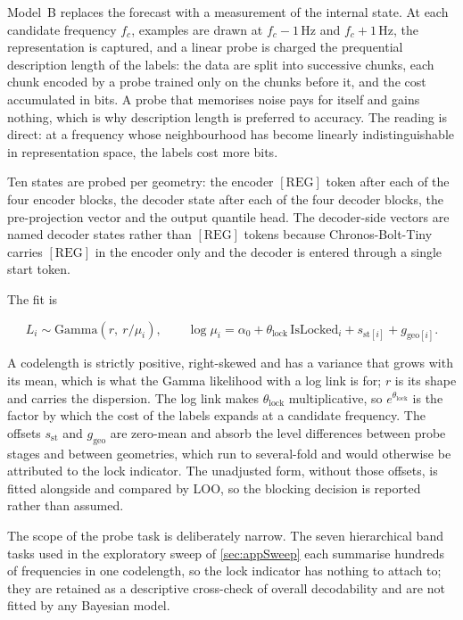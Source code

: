 Model~B replaces the forecast with a measurement of the internal state. At each candidate frequency $f_c$, examples are drawn at $f_c-1$\,Hz and $f_c+1$\,Hz, the representation is captured, and a linear probe is charged the prequential description length of the labels\autocite{voitaInformationTheoreticProbingMinimum2020}: the data are split into successive chunks, each chunk encoded by a probe trained only on the chunks before it, and the cost accumulated in bits. A probe that memorises noise pays for itself and gains nothing, which is why description length is preferred to accuracy. The reading is direct: at a frequency whose neighbourhood has become linearly indistinguishable in representation space, the labels cost more bits.

Ten states are probed per geometry: the encoder $[\mathrm{REG}]$ token after each of the four encoder blocks, the decoder state after each of the four decoder blocks, the pre-projection vector and the output quantile head. The decoder-side vectors are named decoder states rather than $[\mathrm{REG}]$ tokens because Chronos-Bolt-Tiny carries $[\mathrm{REG}]$ in the encoder only and the decoder is entered through a single start token.

The fit is

\begin{equation*}
L_i \sim \text{Gamma}\!\left(r,\ r/\mu_i\right),
\qquad
\log \mu_i = \alpha_0 + \theta_{\mathrm{lock}}\,\mathrm{IsLocked}_i + s_{\text{st}[i]} + g_{\text{geo}[i]}.
\end{equation*}

A codelength is strictly positive, right-skewed and has a variance that grows with its mean, which is what the Gamma likelihood with a log link is for; $r$ is its shape and carries the dispersion. The log link makes $\theta_{\mathrm{lock}}$ multiplicative, so $e^{\theta_{\mathrm{lock}}}$ is the factor by which the cost of the labels expands at a candidate frequency. The offsets $s_{\text{st}}$ and $g_{\text{geo}}$ are zero-mean and absorb the level differences between probe stages and between geometries, which run to several-fold and would otherwise be attributed to the lock indicator. The unadjusted form, without those offsets, is fitted alongside and compared by LOO, so the blocking decision is reported rather than assumed.

The scope of the probe task is deliberately narrow. The seven hierarchical band tasks used in the exploratory sweep of \autoref{sec:appSweep} each summarise hundreds of frequencies in one codelength, so the lock indicator has nothing to attach to; they are retained as a descriptive cross-check of overall decodability and are not fitted by any Bayesian model.

